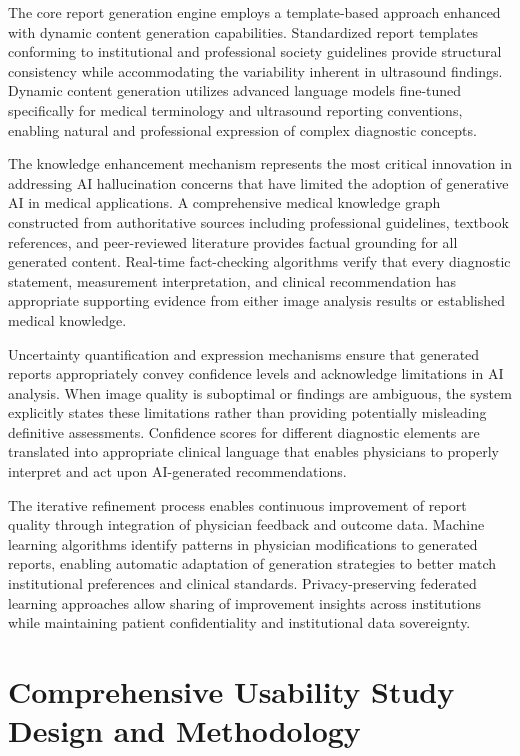The core report generation engine employs a template-based approach enhanced with dynamic content generation capabilities. Standardized report templates conforming to institutional and professional society guidelines provide structural consistency while accommodating the variability inherent in ultrasound findings. Dynamic content generation utilizes advanced language models fine-tuned specifically for medical terminology and ultrasound reporting conventions, enabling natural and professional expression of complex diagnostic concepts.

The knowledge enhancement mechanism represents the most critical innovation in addressing AI hallucination concerns that have limited the adoption of generative AI in medical applications. A comprehensive medical knowledge graph constructed from authoritative sources including professional guidelines, textbook references, and peer-reviewed literature provides factual grounding for all generated content. Real-time fact-checking algorithms verify that every diagnostic statement, measurement interpretation, and clinical recommendation has appropriate supporting evidence from either image analysis results or established medical knowledge.

Uncertainty quantification and expression mechanisms ensure that generated reports appropriately convey confidence levels and acknowledge limitations in AI analysis. When image quality is suboptimal or findings are ambiguous, the system explicitly states these limitations rather than providing potentially misleading definitive assessments. Confidence scores for different diagnostic elements are translated into appropriate clinical language that enables physicians to properly interpret and act upon AI-generated recommendations.

The iterative refinement process enables continuous improvement of report quality through integration of physician feedback and outcome data. Machine learning algorithms identify patterns in physician modifications to generated reports, enabling automatic adaptation of generation strategies to better match institutional preferences and clinical standards. Privacy-preserving federated learning approaches allow sharing of improvement insights across institutions while maintaining patient confidentiality and institutional data sovereignty.

\section{Comprehensive Usability Study Design and Methodology}

